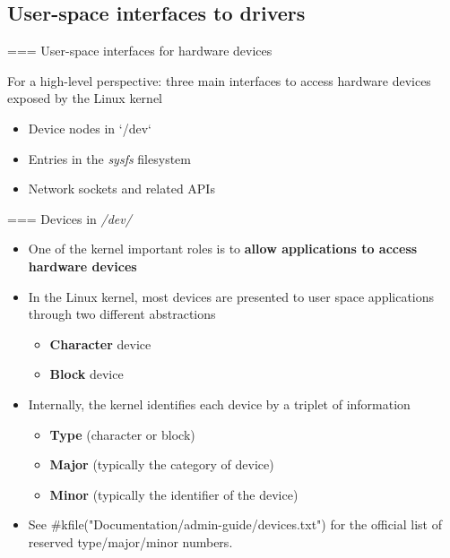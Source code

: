 \subsection{User-space interfaces to drivers}

=== {User-space interfaces for hardware devices}

  For a high-level perspective: three main interfaces to access
  hardware devices exposed by the Linux kernel

  \begin{itemize}
  \item Device nodes in `/dev`
  \item Entries in the {\em sysfs} filesystem
  \item Network sockets and related APIs
  \end{itemize}


=== {Devices in {\em /dev/}}
  \begin{itemize}
  \item One of the kernel important roles is to {\bf allow applications
      to access hardware devices}
  \item In the Linux kernel, most devices are presented to user space
    applications through two different abstractions
    \begin{itemize}
    \item {\bf Character} device
    \item {\bf Block} device
    \end{itemize}
  \item Internally, the kernel identifies each device by a triplet of
    information
    \begin{itemize}
    \item {\bf Type} (character or block)
    \item {\bf Major} (typically the category of device)
    \item {\bf Minor} (typically the identifier of the device)
    \end{itemize}
  \item See #kfile("Documentation/admin-guide/devices.txt") for the
    official list of reserved type/major/minor numbers.
  \end{itemize}


